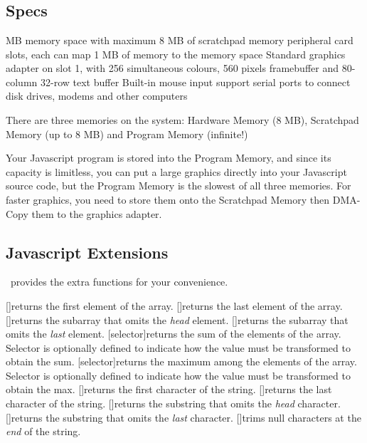 \chapter{\thismachine}

\section{Specs}

\begin{outline}
 MB memory space with maximum 8 MB of scratchpad memory
 peripheral card slots, each can map 1 MB of memory to the memory space
\1 Standard graphics adapter on slot 1, with 256 simultaneous colours, 560 pixels framebuffer and 80-column 32-row text buffer
\1 Built-in mouse input support
 serial ports to connect disk drives, modems and other computers
\end{outline}

There are three memories on the system: Hardware Memory (8 MB), Scratchpad Memory (up to 8 MB) and Program Memory (infinite!)

Your Javascript program is stored into the Program Memory, and since its capacity is limitless, you can put a large graphics directly into your Javascript source code, but the Program Memory is the slowest of all three memories. For faster graphics, you need to store them onto the Scratchpad Memory then DMA-Copy them to the graphics adapter.

\section{Javascript Extensions}

\thismachine\ provides the extra functions for your convenience.

\begin{outline}
\1[]{returns the first element of the array.}
\1[]{returns the last element of the array.}
\1[]{returns the subarray that omits the \emph{head} element.}
\1[]{returns the subarray that omits the \emph{last} element.}
\1[selector]{returns the sum of the elements of the array. Selector is optionally defined to indicate how the value must be transformed to obtain the sum.}
\1[selector]{returns the maximum among the elements of the array. Selector is optionally defined to indicate how the value must be transformed to obtain the max.}
\1[]{returns the first character of the string.}
\1[]{returns the last character of the string.}
\1[]{returns the substring that omits the \emph{head} character.}
\1[]{returns the substring that omits the \emph{last} character.}
\1[]{trims null characters at the \emph{end} of the string.}
\end{outline}



